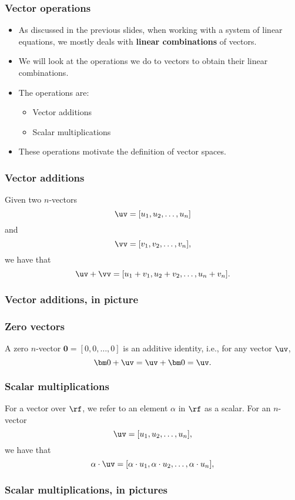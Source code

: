 \begin{frame}
  \frametitle{Vector operations}

  \begin{itemize}
  \item As discussed in the previous slides, when working with a
    system of linear equations, we mostly deals with {\bf linear
      combinations} of vectors.
  \item We will look at the operations we do to vectors to obtain
    their linear combinations.
    \pause
  \item The operations are:
    \begin{itemize}
    \item Vector additions
    \item Scalar multiplications
    \end{itemize}
  \item These operations motivate the definition of vector spaces.
  \end{itemize}
\end{frame}

\begin{frame}
  \frametitle{Vector additions}

  Given two $n$-vectors
  \[
  \uv = [u_1,u_2,\ldots,u_n]
  \]
  and
  \[
  \vv = [v_1,v_2,\ldots,v_n],
  \]
  we have that
  \[
  \uv+\vv = [u_1+v_1,u_2+v_2,\ldots,u_n+v_n].
  \]
\end{frame}

\begin{frame}
  \frametitle{Vector additions, in picture}
\end{frame}

\begin{frame}
  \frametitle{Zero vectors}
  A zero $n$-vector ${\bm 0}=[0,0,\ldots,0]$ is an additive identity, i.e.,
  for any vector $\uv$,
  \[
  {\bm 0} + \uv = \uv + {\bm 0} = \uv. 
  \]
\end{frame}

\begin{frame}
  \frametitle{Scalar multiplications}

  For a vector over $\rf$, we refer to an element $\alpha$ in
  $\rf$ as a scalar.  For an $n$-vector
  \[
  \uv = [u_1,u_2,\ldots,u_n],
  \]
  we have that
  \[
  \alpha\cdot\uv = [\alpha\cdot u_1, \alpha\cdot u_2,\ldots, \alpha\cdot u_n],
  \]
\end{frame}

\begin{frame}
  \frametitle{Scalar multiplications, in pictures}
\end{frame}

